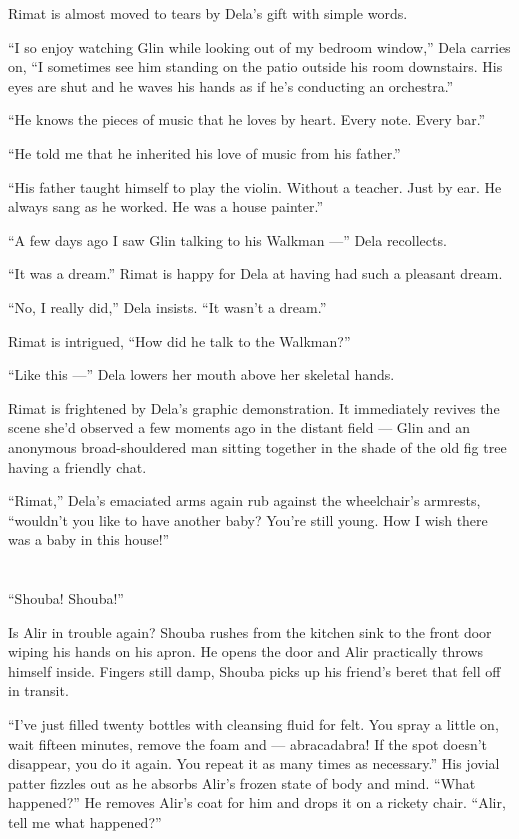 \documentclass[twoside,11pt,openany]{book}
\begin{document}
Rimat is almost moved to tears by Dela's gift with simple words.

``I so enjoy watching Glin while looking out of my bedroom window,'' Dela carries on,
``I sometimes see him standing on the patio outside his room downstairs. His eyes are shut and he waves
his hands as if he's conducting an orchestra.''

``He knows the pieces of music that he loves by heart. Every note. Every bar.''

``He told me that he inherited his love of music from his father.''

``His father taught himself to play the violin. Without a teacher. Just by ear. He always sang as he
worked. He was a house painter.''

``A few days ago I saw Glin talking to his Walkman ---'' Dela recollects.

``It was a dream.'' Rimat is happy for Dela at having had such a pleasant dream.

``No, I really did,'' Dela insists. ``It wasn't a dream.''

Rimat is intrigued, ``How did he talk to the Walkman?''

``Like this ---'' Dela lowers her mouth above her skeletal hands.

Rimat is frightened by Dela's graphic demonstration. It immediately revives the scene she'd observed a few moments ago
in the distant field --- Glin and an anonymous broad-shouldered man sitting together in the shade of the old fig tree
having a friendly chat.

``Rimat,'' Dela's emaciated arms again rub against the wheelchair's armrests,
``wouldn't you like to have another baby? You're still young. How I wish there was a baby in this
house!''


\bigskip

\chapter{}

``Shouba! Shouba!''

Is Alir in trouble again?  Shouba rushes from the kitchen sink to the front door wiping his hands on his apron. He opens
the door and Alir practically throws himself inside. Fingers still damp, Shouba picks up his friend's beret that fell
off in transit.

``I've just filled twenty bottles with cleansing fluid for felt. You spray a little on, wait fifteen
minutes, remove the foam and --- abracadabra! If the spot doesn't disappear, you do it again. You repeat it as many times
as necessary.'' His jovial patter fizzles out as he absorbs Alir's frozen state of body and mind.
``What happened?'' He removes Alir's coat for him and drops it on a rickety
chair.  ``Alir, tell me what happened?''
\end{document}
